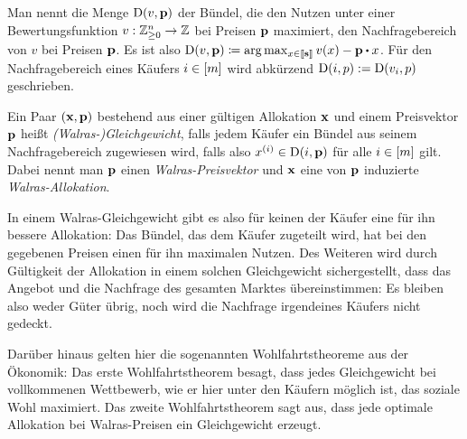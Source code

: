 \begin{definition}[Nachfragebereich]
	Man nennt die Menge $\operatorname{D}(v,\mathbf{p})$ der Bündel, die den Nutzen unter einer Bewertungsfunktion $v:\mathbb{Z}^n_{\geq 0} \rightarrow \mathbb{Z}$ bei Preisen $\mathbf{p}$ maximiert, den Nachfragebereich von $v$ bei Preisen $\mathbf{p}$.
	Es ist also $ \NB(v, \fp) \coloneqq \arg\max_{x\in\ffirst{\fs}} v(x) - \fp \bcdot x$.
	Für den Nachfragebereich eines Käufers $i\in\left[ m \right]$ wird abkürzend $\operatorname{D}(i,p):=\operatorname{D}(v_i, p)$ geschrieben.
\end{definition}

\begin{definition}
	Ein Paar $(\mathbf{x}, \mathbf{p})$ bestehend aus einer gültigen Allokation $\mathbf{x}$ und einem Preisvektor $\mathbf{p}$ heißt \emph{(Walras-)Gleichgewicht}, falls jedem Käufer ein Bündel aus seinem Nachfragebereich zugewiesen wird, falls also $x^{(i)} \in \operatorname{D}(i, \mathbf{p})$ für alle $i\in \left[ m \right]$ gilt.
	Dabei nennt man $\mathbf{p}$ einen \emph{Walras-Preisvektor} und $\mathbf{x}$ eine von $\mathbf{p}$ induzierte \emph{Walras-Allokation}.
\end{definition}

In einem Walras-Gleichgewicht gibt es also für keinen der Käufer eine für ihn bessere Allokation: Das Bündel, das dem Käufer zugeteilt wird, hat bei den gegebenen Preisen einen für ihn maximalen Nutzen.
Des Weiteren wird durch Gültigkeit der Allokation in einem solchen Gleichgewicht sichergestellt, dass das Angebot und die Nachfrage des gesamten Marktes übereinstimmen: Es bleiben also weder Güter übrig, noch wird die Nachfrage irgendeines Käufers nicht gedeckt.

Darüber hinaus gelten hier die sogenannten Wohlfahrtstheoreme aus der Ökonomik:
Das erste Wohlfahrtstheorem besagt, dass jedes Gleichgewicht bei vollkommenen Wettbewerb, wie er hier unter den Käufern möglich ist, das soziale Wohl maximiert.
Das zweite Wohlfahrtstheorem sagt aus, dass jede optimale Allokation bei Walras-Preisen ein Gleichgewicht erzeugt.

